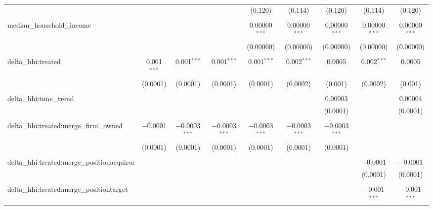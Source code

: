 \begin{table}[H]
{\begin{tabular}{@{\extracolsep{5pt}}lcccccccc}
   &  &  &  & (0.120) & (0.114) & (0.120) & (0.114) & (0.120) \\  

   & & & & & & & & \\  

  median\_household\_income &  &  &  & 0.00000$^{***}$ & 0.00000$^{***}$ & 0.00000$^{***}$ & 0.00000$^{***}$ & 0.00000$^{***}$ \\  

   &  &  &  & (0.00000) & (0.00000) & (0.00000) & (0.00000) & (0.00000) \\  

   & & & & & & & & \\  

  delta\_hhi:treated & 0.001$^{***}$ & 0.001$^{***}$ & 0.001$^{***}$ & 0.001$^{***}$ & 0.002$^{***}$ & 0.0005 & 0.002$^{***}$ & 0.0005 \\  

   & (0.0001) & (0.0001) & (0.0001) & (0.0001) & (0.0002) & (0.001) & (0.0002) & (0.001) \\  

   & & & & & & & & \\  

  delta\_hhi:time\_trend &  &  &  &  &  & 0.00003 &  & 0.00004 \\  

   &  &  &  &  &  & (0.0001) &  & (0.0001) \\  

   & & & & & & & & \\  

  delta\_hhi:treated:merge\_firm\_owned & $-$0.0001 & $-$0.0003$^{***}$ & $-$0.0003$^{***}$ & $-$0.0003$^{***}$ & $-$0.0003$^{***}$ & $-$0.0003$^{***}$ &  &  \\  

   & (0.0001) & (0.0001) & (0.0001) & (0.0001) & (0.0001) & (0.0001) &  &  \\  

   & & & & & & & & \\  

  delta\_hhi:treated:merge\_positionacquiror &  &  &  &  &  &  & $-$0.0001 & $-$0.0001 \\  

   &  &  &  &  &  &  & (0.0001) & (0.0001) \\  

   & & & & & & & & \\  

  delta\_hhi:treated:merge\_positiontarget &  &  &  &  &  &  & $-$0.001$^{***}$ & $-$0.001$^{***}$ \\  


\end{tabular}}
\end{table}
